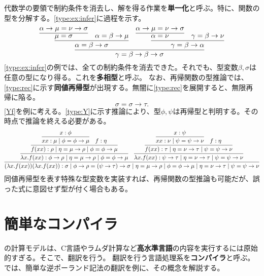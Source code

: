 \documentclass[10pt,a4paper]{book}
\begin{document}
%
代数学の要領で制約条件を消去し、解を得る作業を\textbf{単一化}と呼ぶ。特に、関数の型を分解する。\eqref{type:ex:infer}に過程を示す。
%
\begin{equation}
\label{eq:type:ex:infer}
\infer{
\gamma = \beta \to \beta \to \sigma
}{
\infer{\alpha = \beta \to \sigma}{\infer{\mu = \sigma}{\alpha \to \mu = \nu \to \sigma} & \alpha = \beta \to \mu}
&
\infer{\gamma = \beta \to \alpha}{\infer{\alpha = \nu}{\alpha \to \mu = \nu \to \sigma} & \gamma = \beta \to \nu}
}
\end{equation}
%
\eqref{type:ex:infer}の例では、全ての制約条件を消去できた。それでも、型変数$\beta,\sigma$は任意の型になり得る。これを\textbf{多相型}と呼ぶ。
なお、再帰関数の型推論では、\eqref{type:rec}に示す\textbf{同値再帰型}が出現する。無闇に\eqref{type:rec}を展開すると、無限再帰に陥る。
%
\begin{equation}
\label{eq:type:rec}
\sigma = \sigma \to \tau.
\end{equation}
%
\eqref{Yf}を例に考える。\eqref{type:Y}に示す推論により、型$\phi,\psi$は再帰型と判明する。その時点で推論を終える必要がある。
%
\begin{equation}
\label{eq:type:Y}
\infer{
(\lambda x.f(xx))(\lambda x.f(xx)): \sigma
\mid \phi \to \rho = (\psi \to \tau) \to \sigma
\mid \eta = \mu \to \rho \mid \phi = \phi \to \mu
\mid \eta = \nu \to \tau \mid \psi = \psi \to \nu
}{
\infer{
\lambda x.f(xx): \phi \to \rho
\mid \eta = \mu \to \rho \mid \phi = \phi \to \mu
}{
\infer{
f(xx): \rho
\mid \eta = \mu \to \rho \mid \phi = \phi \to \mu
}{
\infer{xx: \mu \mid \phi = \phi \to \mu}{x: \phi} & f: \eta
}
}
&
\infer{
\lambda x.f(xx): \psi \to \tau
\mid \eta = \nu \to \tau \mid \psi = \psi \to \nu
}{
\infer{
f(xx): \tau
\mid \eta = \nu \to \tau \mid \psi = \psi \to \nu
}{
\infer{xx: \nu \mid \psi = \psi \to \nu}{x: \psi} & f: \eta
}
}
}
\end{equation}
%
同値再帰型を表す特殊な型変数を実装すれば、再帰関数の型推論も可能だが、誤った式に意図せず型が付く場合もある。

\chapter{簡単なコンパイラ\label{chap:math}}

の計算モデルは、C言語やラムダ計算など\textbf{高水準言語}の内容を実行するには原始的すぎる。そこで、翻訳を行う。
翻訳を行う言語処理系を\textbf{コンパイラ}と呼ぶ。では、簡単な逆ポーランド記法の翻訳を例に、その概念を解説する。
\end{document}
